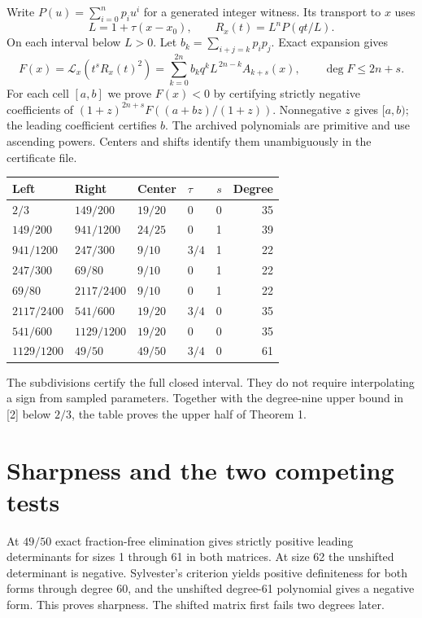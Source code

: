 \documentclass[11pt]{article}
\newcommand{\A}{A}\newcommand{\Lx}{\mathcal L_x}
\begin{document}
Write \(P(u)=\sum_{i=0}^n p_i u^i\) for a generated integer witness. Its transport to \(x\) uses
\[
   L=1+\tau(x-x_0),\qquad R_x(t)=L^n P(qt/L).
\]
On each interval below \(L>0\). Let \(b_k=\sum_{i+j=k}p_i p_j\). Exact expansion gives
\[
  F(x)=\Lx(t^sR_x(t)^2)
      =\sum_{k=0}^{2n}b_k q^k L^{\,2n-k}\A_{k+s}(x),
  \qquad \deg F\le 2n+s .
\]
For each cell \([a,b]\) we prove \(F(x)<0\) by certifying strictly negative coefficients of
\((1+z)^{2n+s}F((a+bz)/(1+z))\). Nonnegative \(z\) gives \([a,b)\); the leading coefficient certifies \(b\). The archived polynomials are primitive and use ascending powers. Centers and shifts identify them unambiguously in the certificate file.
\begin{center}\small
\begin{tabular}{llllrr}\toprule
Left & Right & Center & \(\tau\) & \(s\)& Degree\\\midrule
\(2/3\)&\(149/200\)&\(19/20\)&0&0&35\\
\(149/200\)&\(941/1200\)&\(24/25\)&0&1&39\\
\(941/1200\)&\(247/300\)&\(9/10\)&\(3/4\)&1&22\\
\(247/300\)&\(69/80\)&\(9/10\)&0&1&22\\
\(69/80\)&\(2117/2400\)&\(9/10\)&0&1&22\\
\(2117/2400\)&\(541/600\)&\(19/20\)&\(3/4\)&0&35\\
\(541/600\)&\(1129/1200\)&\(19/20\)&0&0&35\\
\(1129/1200\)&\(49/50\)&\(49/50\)&\(3/4\)&0&61\\\bottomrule
\end{tabular}
\end{center}
The subdivisions certify the full closed interval. They do not require interpolating a sign from sampled parameters. Together with the degree-nine upper bound in [2] below \(2/3\), the table proves the upper half of Theorem 1.
\newpage
\section{Sharpness and the two competing tests}
At \(49/50\) exact fraction-free elimination gives strictly positive leading determinants for sizes 1 through 61 in both matrices. At size 62 the unshifted determinant is negative. Sylvester's criterion yields positive definiteness for both forms through degree 60, and the unshifted degree-61 polynomial gives a negative form. This proves sharpness. The shifted matrix first fails two degrees later.
\end{document}
